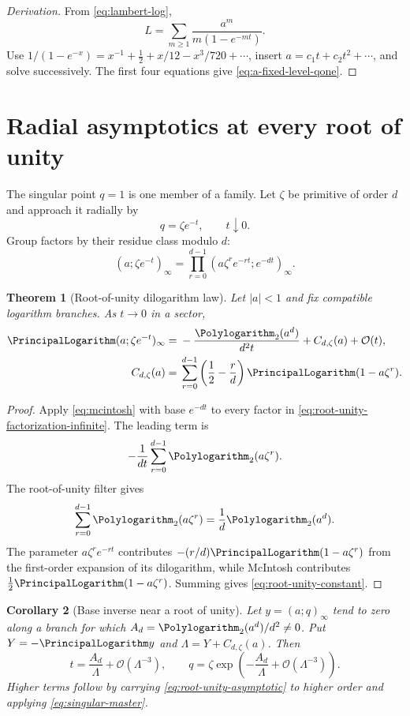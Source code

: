 \documentclass[11pt,oneside]{book}
\newtheorem{theorem}{Theorem}[chapter]
\newtheorem{corollary}[theorem]{Corollary}
\theoremstyle{definition}
\theoremstyle{remark}
\newcommand{\OO}{\mathcal{O}}
\begin{document}
\begin{proof}[Derivation]
From \eqref{eq:lambert-log},
\[
 L=\sum_{m\ge1}\frac{a^m}{m(1-e^{-mt})}.
\]
Use
$1/(1-e^{-x})=x^{-1}+\tfrac12+x/12-x^3/720+\cdots$, insert
$a=c_1t+c_2t^2+\cdots$, and solve successively.  The first four equations give
\eqref{eq:a-fixed-level-qone}.
\end{proof}

\section{Radial asymptotics at every root of unity}
The singular point $q=1$ is one member of a family.  Let $\zeta$ be primitive
of order $d$ and approach it radially by
\[
 q=\zeta e^{-t},\qquad t\downarrow0.
\]
Group factors by their residue class modulo $d$:
\begin{equation}\label{eq:root-unity-factorization-infinite}
 (a;\zeta e^{-t})_\infty
 =\prod_{r=0}^{d-1}
 (a\zeta^re^{-rt};e^{-dt})_\infty.
\end{equation}

\begin{theorem}[Root-of-unity dilogarithm law]\label{thm:root-unity-dilog}
Let $|a|<1$ and fix compatible logarithm branches.  As $t\to0$ in a sector,
\begin{align}
 \PrincipalLogarithm(a;\zeta e^{-t})_\infty
={}&-\frac{\Polylogarithm_2(a^d)}{d^2t}+C_{d,\zeta}(a)+\OO(t),
 \label{eq:root-unity-asymptotic}\\
 C_{d,\zeta}(a)
={}&\sum_{r=0}^{d-1}\left(\frac12-\frac rd\right)
       \PrincipalLogarithm(1-a\zeta^r).\label{eq:root-unity-constant}
\end{align}
\end{theorem}
\begin{proof}
Apply \eqref{eq:mcintosh} with base $e^{-dt}$ to every factor in
\eqref{eq:root-unity-factorization-infinite}.  The leading term is
\[
 -\frac1{dt}\sum_{r=0}^{d-1}\Polylogarithm_2(a\zeta^r).
\]
The root-of-unity filter gives
\[
 \sum_{r=0}^{d-1}\Polylogarithm_2(a\zeta^r)
 =\frac1d\Polylogarithm_2(a^d).
\]
The parameter $a\zeta^re^{-rt}$ contributes
$-(r/d)\PrincipalLogarithm(1-a\zeta^r)$ from the first-order expansion of its dilogarithm,
while McIntosh contributes $\tfrac12\PrincipalLogarithm(1-a\zeta^r)$.  Summing gives
\eqref{eq:root-unity-constant}.
\end{proof}

\begin{corollary}[Base inverse near a root of unity]\label{cor:q-root-unity-inverse}
Let $y=(a;q)_\infty$ tend to zero along a branch for which
$A_d=\Polylogarithm_2(a^d)/d^2\ne0$.  Put $Y=-\PrincipalLogarithm y$ and
$\Lambda=Y+C_{d,\zeta}(a)$.  Then
\[
 t=\frac{A_d}{\Lambda}+\OO(\Lambda^{-3}),
 \qquad q=\zeta\exp\left(-\frac{A_d}{\Lambda}
 +\OO(\Lambda^{-3})\right).
\]
Higher terms follow by carrying \eqref{eq:root-unity-asymptotic} to higher
order and applying \eqref{eq:singular-master}.
\end{corollary}
\end{document}
